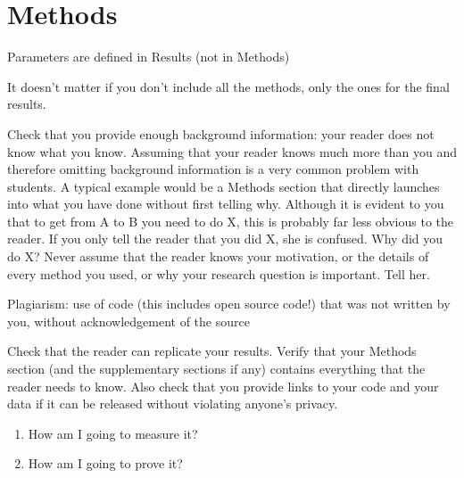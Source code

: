 \chapter{Methods} \label{Chapter: Methods}

Parameters are defined in Results (not in Methods)

It doesn't matter if you don't include all the methods, only the ones for the final results.

Check that you provide enough background information: your reader does not know what you know. Assuming that your reader knows much more than you and therefore omitting background information is a very common problem with students. A typical example would be a Methods section that directly launches into what you have done without first telling why. Although it is evident to you that to get from A to B you need to do X, this is probably far less obvious to the reader. If you only tell the reader that you did X, she is confused. Why did you do X? Never assume that the reader knows your motivation, or the details of every method you used, or why your research question is important. Tell her.

Plagiarism: use of code (this includes open source code!) that was not written by you, without acknowledgement of the source

Check that the reader can replicate your results. Verify that your Methods section (and the supplementary sections if any) contains everything that the reader needs to know. Also check that you provide links to your code and your data if it can be released without violating anyone’s privacy.

\begin{enumerate}
\item How am I going to measure it?
\item How am I going to prove it?
\end{enumerate}
